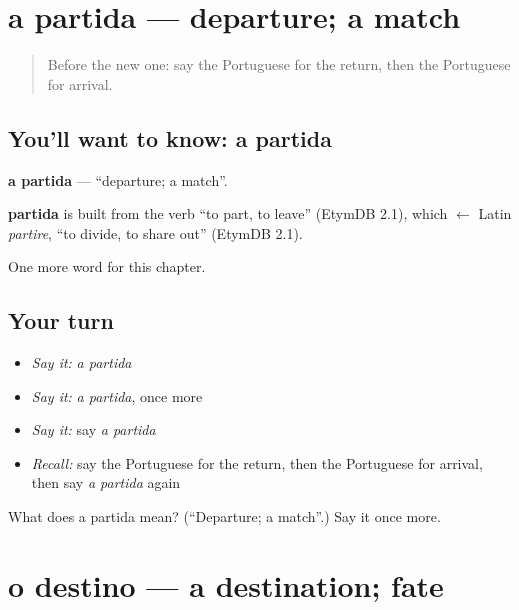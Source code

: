 \section[a partida]{a partida — departure; a match}

\label{lesson:PT-C166-partida}



\begin{quote}
Before the new one: say the Portuguese for the return, then the Portuguese for arrival.
\end{quote}

\subsection*{You'll want to know: a partida}
\textbf{a partida} — \textquotedblleft{}departure; a match\textquotedblright{}.

\begin{cousinweb}
\textbf{partida} is built from the verb \textquotedblleft{}to part, to leave\textquotedblright{} (EtymDB 2.1), which $\leftarrow$ Latin \emph{partire}, \textquotedblleft{}to divide, to share out\textquotedblright{} (EtymDB 2.1).
\end{cousinweb}

\begin{grammarlens}[title={What you've built}]
One more word for this chapter.
\end{grammarlens}

\subsection*{Your turn}
\begin{itemize}
\raggedright
  \item \emph{Say it:} \emph{a partida}
  \item \emph{Say it:} \emph{a partida}, once more
  \item \emph{Say it:} say \emph{a partida}
  \item \emph{Recall:} say the Portuguese for the return, then the Portuguese for arrival, then say \emph{a partida} again
\end{itemize}

\begin{tcolorbox}[breakable,colback=teal!4,colframe=teal!35!black,title={Before you move on}]
What does a partida mean? (\textquotedblleft{}Departure; a match\textquotedblright{}.) Say it once more.
\end{tcolorbox}
\section[o destino]{o destino — a destination; fate}

